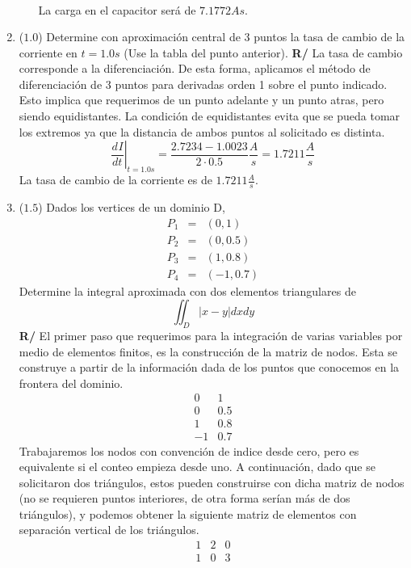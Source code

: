 \documentclass[12pt]{article}
\newcommand{\diff}[3]{\frac{d^{#3} #1}{d#2^{#3}}}
\begin{document}
\begin{enumerate}[leftmargin=*,widest=9]
\begin{enumerate}[label=\alph*]
\begin{eqnarray*}
\end{eqnarray*}
La carga en el capacitor será de \(7.1772As\).
    \end{enumerate}
    \item (\(1.0\)) Determine con aproximación central de 3 puntos la tasa de cambio de la corriente en $t = 1.0 s$ (Use la tabla del punto anterior).
\textbf{R/} La tasa de cambio corresponde a la diferenciación. De esta forma, aplicamos el método de diferenciación de 3 puntos para derivadas orden 1 sobre el punto indicado. Esto implica que requerimos de un punto adelante y un punto atras, pero siendo equidistantes. La condición de equidistantes evita que se pueda tomar los extremos ya que la distancia de ambos puntos al solicitado es distinta.
\[
\left.\diff{I}{t}{}\right|_{t=1.0s} = \frac{2.7234-1.0023}{2\cdot 0.5} \frac{A}{s} = 1.7211 \frac{A}{s}
\]
La tasa de cambio de la corriente es de \(1.7211 \frac{A}{s}\).
   \item (\(1.5\)) Dados los vertices de un dominio D,
   	\begin{eqnarray*}
   	P_1 &=& (0 , 1) \\ P_2 &=& (0 , 0.5) \\ P_3 &=& (1 , 0.8) \\ P_4 &=& (-1 , 0.7)
   	\end{eqnarray*}
Determine la integral aproximada con dos elementos triangulares de $$\iint _{D} |x-y| dx dy$$
\textbf{R/} El primer paso que requerimos para la integración de varias variables por medio de elementos finitos, es la construcción de la matriz de nodos. Esta se construye a partir de la información dada de los puntos que conocemos en la frontera del dominio.
\[
\begin{array}{cc}
0 & 1\\
0 & 0.5\\
1 & 0.8\\
-1 & 0.7
\end{array}
\]
Trabajaremos los nodos con convención de indice desde cero, pero es equivalente si el conteo empieza desde uno.
A continuación, dado que se solicitaron dos triángulos, estos pueden construirse con dicha matriz de nodos (no se requieren puntos interiores, de otra forma serían más de dos triángulos), y podemos obtener la siguiente matriz de elementos con separación vertical de los triángulos.
\[
\begin{array}{ccc}
1 & 2 & 0\\
1 & 0 & 3
\end{array}
\]
\end{enumerate}
\end{document}
